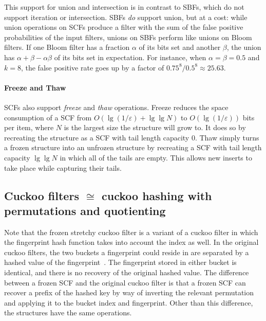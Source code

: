 \documentclass[letterpaper,twocolumn,10pt]{article}
\newcommand{\taffy}{stretchy}
\newcommand{\TBF}{SBF}
\newcommand{\TCF}{SCF}
\newcommand{\taffy}{taffy}
\newcommand{\TBF}{TBF}
\newcommand{\TCF}{TCF}
\begin{document}

This support for union and intersection is in contrast to \TBF{}s, which do not support iteration or intersection.
\TBF{}s {\em do} support union, but at a cost: while union operations on \TCF{}s produce a filter with the sum of the false positive probabilities of the input filters, unions on \TBF{}s perform like unions on Bloom filters.
If one Bloom filter has a fraction $\alpha$ of its bits set and another $\beta$, the union has $\alpha + \beta - \alpha \beta$ of its bits set in expectation.
For instance, when $\alpha = \beta = 0.5$ and $k = 8$, the false positive rate goes up by a factor of $0.75^8/0.5^8 \approx 25.63$. %

\paragraph{Freeze and Thaw}
\TCF{}s also support {\em freeze} and {\em thaw} operations.
Freeze reduces the space consumption of a \TCF{} from $O(\lg(1/\varepsilon) + \lg \lg N)$ to $O(\lg (1 / \varepsilon))$ bits per item, where $N$ is the largest size the structure will grow to.
It does so by recreating the structure as a \TCF{} with tail length capacity $0$.
Thaw simply turns a frozen structure into an unfrozen structure by recreating a \TCF{} with tail length capacity $\lg \lg N$ in which all of the tails are empty.
This allows new inserts to take place while capturing their tails.

\subsection{Cuckoo filters $\cong$ cuckoo hashing with permutations and quotienting}
\label{dictionary}

Note that the frozen \taffy{} cuckoo filter is a variant of a cuckoo filter in which the fingerprint hash function takes into account the index as well.
In the original cuckoo filters, the two buckets a fingerprint could reside in are separated by a hashed value of the fingerprint~\cite{cuckoo}.
The fingerprint stored in either bucket is identical, and there is no recovery of the original hashed value.
The difference between a frozen \TCF{} and the original cuckoo filter is that a frozen \TCF{} can recover a prefix of the hashed key by way of inverting the relevant permutation and applying it to the bucket index and fingerprint.
Other than this difference, the structures have the same operations.
\end{document}
